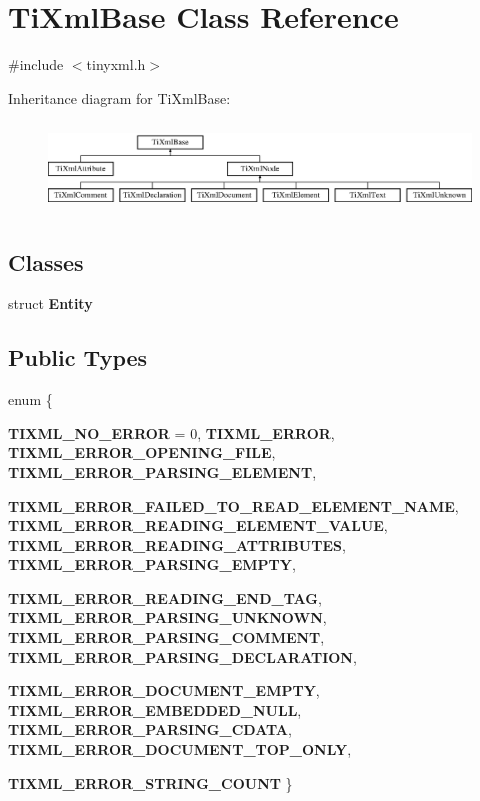 \hypertarget{class_ti_xml_base}{
\section{TiXmlBase Class Reference}
\label{class_ti_xml_base}
}


{\ttfamily \#include $<$tinyxml.h$>$}

Inheritance diagram for TiXmlBase:\begin{figure}[H]
\begin{center}
\leavevmode
\includegraphics[height=2.413793cm]{class_ti_xml_base}
\end{center}
\end{figure}
\subsection*{Classes}
\begin{DoxyCompactItemize}
\item 
struct {\bfseries Entity}
\end{DoxyCompactItemize}
\subsection*{Public Types}
\begin{DoxyCompactItemize}
\item 
enum \{ \par
{\bfseries TIXML\_\-NO\_\-ERROR} =  0, 
{\bfseries TIXML\_\-ERROR}, 
{\bfseries TIXML\_\-ERROR\_\-OPENING\_\-FILE}, 
{\bfseries TIXML\_\-ERROR\_\-PARSING\_\-ELEMENT}, 
\par
{\bfseries TIXML\_\-ERROR\_\-FAILED\_\-TO\_\-READ\_\-ELEMENT\_\-NAME}, 
{\bfseries TIXML\_\-ERROR\_\-READING\_\-ELEMENT\_\-VALUE}, 
{\bfseries TIXML\_\-ERROR\_\-READING\_\-ATTRIBUTES}, 
{\bfseries TIXML\_\-ERROR\_\-PARSING\_\-EMPTY}, 
\par
{\bfseries TIXML\_\-ERROR\_\-READING\_\-END\_\-TAG}, 
{\bfseries TIXML\_\-ERROR\_\-PARSING\_\-UNKNOWN}, 
{\bfseries TIXML\_\-ERROR\_\-PARSING\_\-COMMENT}, 
{\bfseries TIXML\_\-ERROR\_\-PARSING\_\-DECLARATION}, 
\par
{\bfseries TIXML\_\-ERROR\_\-DOCUMENT\_\-EMPTY}, 
{\bfseries TIXML\_\-ERROR\_\-EMBEDDED\_\-NULL}, 
{\bfseries TIXML\_\-ERROR\_\-PARSING\_\-CDATA}, 
{\bfseries TIXML\_\-ERROR\_\-DOCUMENT\_\-TOP\_\-ONLY}, 
\par
{\bfseries TIXML\_\-ERROR\_\-STRING\_\-COUNT}
 \}
\end{DoxyCompactItemize}
